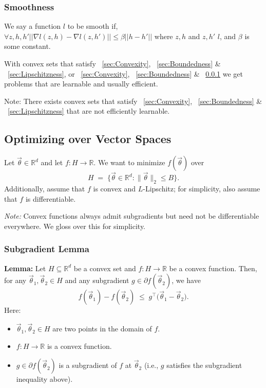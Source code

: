 \documentclass[11pt]{article}
\theoremstyle{plain}
\begin{document}
\subsubsection{Smoothness}\label{sec:Smoothness}
We say a function $l$ to be smooth if,
$\forall z,h,h' \lvert\lvert \nabla l(z,h) - \nabla l(z,h')\rvert\rvert \leq \beta\lvert\lvert h-h'\rvert\rvert$ where ${z,h}$ and ${z, h'}$ \in {}$l$, and $\beta$ is some constant.

With convex sets that satisfy ~\ref{sec:Convexity}, ~\ref{sec:Boundedness} \& ~\ref{sec:Lipschitzness}, or  ~\ref{sec:Convexity}, ~\ref{sec:Boundedness} \& ~\ref{sec:Smoothness} we get problems that are learnable and usually efficient.

\small{Note: There exists convex sets that satisfy ~\ref{sec:Convexity}, ~\ref{sec:Boundedness} \& ~\ref{sec:Lipschitzness} that are not efficiently learnable.}

\subsection{Optimizing over Vector Spaces}
Let $\vec{\theta}\in\mathbb{R}^d$ and let $f:H\to\mathbb{R}$. We want to minimize $f(\vec{\theta})$ over
\[
  H \;=\; \bigl\{\vec{\theta}\in\mathbb{R}^d : \lVert \vec{\theta}\rVert_2 \le B \bigr\}.
\]
Additionally, assume that $f$ is convex and $L$-Lipschitz; for simplicity, also assume that $f$ is differentiable.

\smallskip
\noindent\textit{Note:} Convex functions always admit subgradients but need not be differentiable everywhere. We gloss over this for simplicity.


\subsubsection{Subgradient Lemma}
\textbf{Lemma:}  
Let $H \subseteq \mathbb{R}^d$ be a convex set and $f : H \to \mathbb{R}$ be a convex function.  
Then, for any $\vec{\theta}_1, \vec{\theta}_2 \in H$ and any subgradient $g \in \partial f(\vec{\theta}_2)$, we have
\[
    f(\vec{\theta}_1) - f(\vec{\theta}_2) \;\le\; g^\top \big(\vec{\theta}_1 - \vec{\theta}_2\big).
\]
Here:
\begin{itemize}
    \item $\vec{\theta}_1, \vec{\theta}_2 \in H$ are two points in the domain of $f$.
    \item $f : H \to \mathbb{R}$ is a convex function.
    \item $g \in \partial f(\vec{\theta}_2)$ is a subgradient of $f$ at $\vec{\theta}_2$ (i.e., $g$ satisfies the subgradient inequality above).
\end{itemize}
\end{document}
